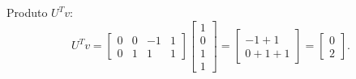 \begin{resolution}
\begin{enumerate}[label=\alph*)]
          Produto \( U^T v \):
          \[
            U^T v = \begin{bmatrix}
              0 & 0 & -1 & 1 \\
              0 & 1 & 1  & 1
            \end{bmatrix}
            \begin{bmatrix}
              1 \\ 0 \\ 1 \\ 1
            \end{bmatrix} =
            \begin{bmatrix}
              -1 + 1 \\ 0 + 1 + 1
            \end{bmatrix} =
            \begin{bmatrix}
              0 \\ 2
            \end{bmatrix}.
          \]


\end{enumerate}
\end{resolution}

